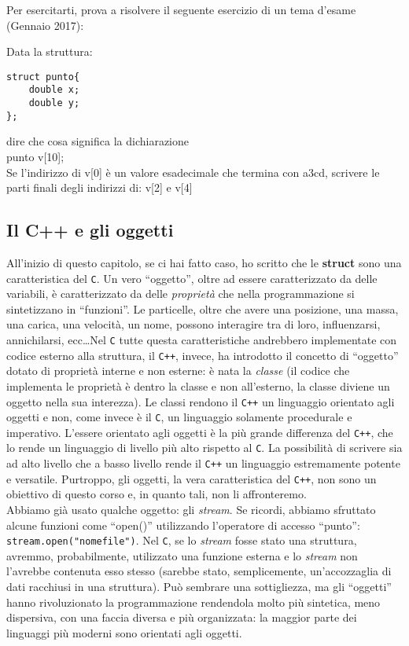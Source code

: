 Per esercitarti, prova a risolvere il seguente esercizio di un tema d'esame (Gennaio 2017): 
\begin{shaded}
Data la struttura:\\
\begin{verbatim}
struct punto{
    double x;
    double y;
};
\end{verbatim}



dire che cosa significa la dichiarazione\\
punto v[10];\\

Se l'indirizzo di v[0] è un valore esadecimale che termina con a3cd, scrivere le parti finali degli indirizzi di:
v[2] e v[4]
\end{shaded}
\begin{small}
\section{Il C++ e gli oggetti}
All'inizio di questo capitolo, se ci hai fatto caso, ho scritto che le \textbf{struct} sono una caratteristica del \verb|C|. Un vero ``oggetto'', oltre ad essere caratterizzato da delle variabili, è caratterizzato da delle \emph{proprietà} che nella programmazione si sintetizzano in ``funzioni''. Le particelle, oltre che avere una posizione, una massa, una carica, una velocità, un nome, possono interagire tra di loro, influenzarsi, annichilarsi, ecc\ldots Nel \verb|C| tutte questa caratteristiche andrebbero implementate con codice esterno alla struttura, il \verb|C++|, invece, ha introdotto il concetto di ``oggetto'' dotato di proprietà interne e non esterne: è nata la \emph{classe} (il codice che implementa le proprietà è dentro la classe e non all'esterno, la classe diviene un oggetto nella sua interezza). Le classi rendono il \verb|C++| un linguaggio orientato agli oggetti e non, come invece è il \verb|C|, un linguaggio solamente procedurale e imperativo. L'essere orientato agli oggetti è la più grande differenza del \verb|C++|, che lo rende un linguaggio di livello più alto rispetto al \verb|C|. La possibilità di scrivere sia ad alto livello che a basso livello rende il \verb|C++| un linguaggio estremamente potente e versatile. Purtroppo, gli oggetti, la vera caratteristica del \verb|C++|, non sono un obiettivo di questo corso e, in quanto tali, non li affronteremo.\\

Abbiamo già usato qualche oggetto: gli \emph{stream}. Se ricordi, abbiamo sfruttato alcune funzioni come ``open()'' utilizzando l'operatore di accesso ``punto'': \verb|stream.open("nomefile")|. Nel \verb|C|, se lo \emph{stream} fosse stato una struttura, avremmo, probabilmente, utilizzato una funzione esterna e lo \emph{stream} non l'avrebbe contenuta esso stesso (sarebbe stato, semplicemente, un'accozzaglia di dati racchiusi in una struttura). Può sembrare una sottigliezza, ma gli ``oggetti'' hanno rivoluzionato la programmazione rendendola molto più sintetica, meno dispersiva, con una faccia diversa e più organizzata: la maggior parte dei linguaggi più moderni sono orientati agli oggetti.
\end{small}


